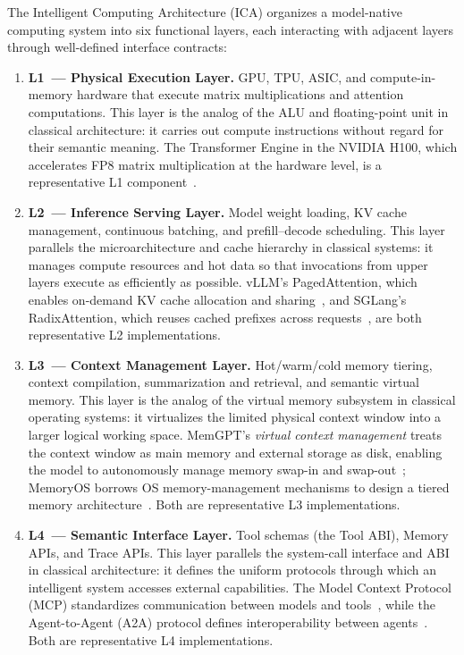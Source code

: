 \begin{definition}
The Intelligent Computing Architecture (ICA) organizes a model-native computing system into six functional layers, each interacting with adjacent layers through well-defined interface contracts:
\begin{enumerate}[nosep]
\item \textbf{L1~--- Physical Execution Layer.}
GPU, TPU, ASIC, and compute-in-memory hardware that execute matrix multiplications and attention computations. This layer is the analog of the ALU and floating-point unit in classical architecture: it carries out compute instructions without regard for their semantic meaning. The Transformer Engine in the NVIDIA H100, which accelerates FP8 matrix multiplication at the hardware level, is a representative L1 component~\cite{wolters2024computeinmemory}.

\item \textbf{L2~--- Inference Serving Layer.}
Model weight loading, KV cache management, continuous batching, and prefill--decode scheduling. This layer parallels the microarchitecture and cache hierarchy in classical systems: it manages compute resources and hot data so that invocations from upper layers execute as efficiently as possible. vLLM's PagedAttention, which enables on-demand KV cache allocation and sharing~\cite{kwon2023pagedattention}, and SGLang's RadixAttention, which reuses cached prefixes across requests~\cite{sglang2024}, are both representative L2 implementations.

\item \textbf{L3~--- Context Management Layer.}
Hot/warm/cold memory tiering, context compilation, summarization and retrieval, and semantic virtual memory. This layer is the analog of the virtual memory subsystem in classical operating systems: it virtualizes the limited physical context window into a larger logical working space. MemGPT's \textit{virtual context management} treats the context window as main memory and external storage as disk, enabling the model to autonomously manage memory swap-in and swap-out~\cite{memgpt2023}; MemoryOS borrows OS memory-management mechanisms to design a tiered memory architecture~\cite{memoryos2025}. Both are representative L3 implementations.

\item \textbf{L4~--- Semantic Interface Layer.}
Tool schemas (the Tool ABI), Memory APIs, and Trace APIs. This layer parallels the system-call interface and ABI in classical architecture: it defines the uniform protocols through which an intelligent system accesses external capabilities. The Model Context Protocol (MCP) standardizes communication between models and tools~\cite{mcp_intro_2026}, while the Agent-to-Agent (A2A) protocol defines interoperability between agents~\cite{agentprotocols2025}. Both are representative L4 implementations.


\end{enumerate}
\end{definition}
